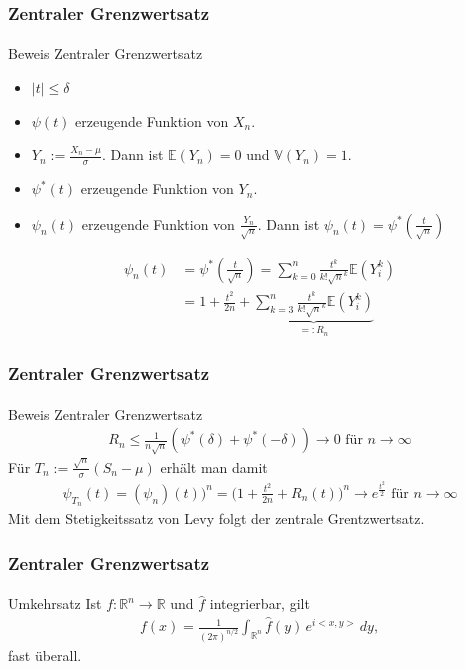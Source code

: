 \documentclass{beamer}
\begin{document}
\begin{frame}
    \frametitle{Zentraler Grenzwertsatz}
\framesubtitle{}

\begin{block}{Beweis Zentraler Grenzwertsatz}
\begin{itemize}
\item $|t| \leq \delta$
\item $\psi(t)$ erzeugende Funktion von $X_n$.
\item $Y_n := \frac{X_n - \mu}{\sigma}$. Dann ist $\mathbb{E}(Y_n) = 0$ und $\mathbb{V}(Y_n) = 1$.
\item $\psi^*(t)$ erzeugende Funktion von $Y_n$.
\item $\psi_n(t)$ erzeugende Funktion von $\frac{Y_n}{\sqrt{n}}$. Dann ist $\psi_n(t) = \psi^*(\frac{t}{\sqrt{n}})$ 
\end{itemize}
\begin{align*}
\psi_n(t) &= \psi^*(\frac{t}{\sqrt{n}}) =  \sum_{k= 0}^n \frac{t^k }{k! \sqrt{n}^k} \mathbb{E}(Y_i^k) \\
& = 1 + \frac{t^2}{2n} +  \underbrace{\sum_{k= 3}^n \frac{t^k }{k! \sqrt{n}^k} \mathbb{E}(Y_i^k)}_{=:R_n} 
\end{align*}
\end{block}

 \end{frame}



\begin{frame}
    \frametitle{Zentraler Grenzwertsatz}
\framesubtitle{}

\begin{block}{Beweis Zentraler Grenzwertsatz}
\begin{align*}
R_n \leq \frac{1}{n \sqrt{n}} (\psi^*(\delta)  + \psi^*(-\delta) ) \rightarrow 0  \text{ für } n \to \infty
\end{align*}
Für $T_n := \frac{\sqrt{n}}{\sigma}(S_n - \mu)$ erhält man damit
\begin{align*}
\psi_{T_n}(t) = (\psi_n)(t))^n = \biggl(  1 + \frac{t^2}{2n} + R_n(t) \biggr)^n \rightarrow e^{\frac{t^2}{2}} \text{ für } n \to \infty
\end{align*}
Mit dem Stetigkeitssatz von Levy folgt der zentrale Grentzwertsatz.
\end{block}


 \end{frame}



\begin{frame}
    \frametitle{Zentraler Grenzwertsatz}
\framesubtitle{}

\begin{block}{Umkehrsatz}
Ist $f: \mathbb{R}^n  \to  \mathbb{R}$ und $\hat{ f}$ integrierbar, gilt
\begin{align*}
f(x) = \frac{1}{\left(2\pi \right)^{n/2}} \int_{\mathbb{R}^n}\hat{ f}(y) \,e^{i  <x, y>} \, d y,
\end{align*}
fast überall.
\end{block}
 \end{frame}
\end{document}
